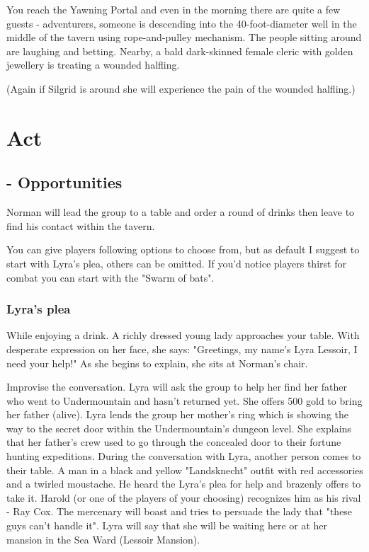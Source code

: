 \documentclass[10pt,onecolumn,twoside,openany,bg=full,layout=true]{dndbook}
\begin{document}
\begin{DndReadAloud}
You reach the Yawning Portal and even in the morning there are quite a few guests - adventurers,
someone is descending into the 40-foot-diameter well in the middle of the tavern using rope-and-pulley mechanism.
The people sitting around are laughing and betting.
Nearby, a bald dark-skinned female cleric with golden jewellery is treating a wounded halfling.
\end{DndReadAloud}
(Again if Silgrid is around she will experience the pain of the wounded halfling.)
\vfill
\newpage


\section{Act }\label{sec:act-\roman{act_num}}
\addtocounter{act_num}{1}


\setcounter{subact_num}{1}
\subsection{ - Opportunities}\label{subsec:\arabic{subact_num}-opportunities}
\addtocounter{subact_num}{1}
Norman will lead the group to a table and order a round of drinks then leave to find his contact within the tavern.

You can give players following options to choose from, but as default I suggest to start with Lyra's plea, others can be omitted.
If you'd notice players thirst for combat you can start with the "Swarm of bats".

\subsubsection{Lyra's plea}
\begin{DndReadAloud}
  While enjoying a drink.
  A richly dressed young lady approaches your table.
  With desperate expression on her face, she says:
  "Greetings, my name's Lyra Lessoir, I need your help!"
  As she begins to explain, she sits at Norman's chair.
\end{DndReadAloud}
Improvise the conversation.
Lyra will ask the group to help her find her father who went to Undermountain and hasn't returned yet.
She offers 500 gold to bring her father (alive).
Lyra lends the group her mother's ring which is showing the way to the secret door within the Undermountain's dungeon level.
She explains that her father's crew used to go through the concealed door to their fortune hunting expeditions.
During the conversation with Lyra, another person comes to their table.
A man in a black and yellow "Landsknecht" outfit with red accessories and a twirled moustache.
He heard the Lyra's plea for help and brazenly offers to take it.
Harold (or one of the players of your choosing) recognizes him as his rival - Ray Cox.
The mercenary will boast and tries to persuade the lady that "these guys can't handle it".
Lyra will say that she will be waiting here or at her mansion in the Sea Ward (Lessoir Mansion).
\end{document}
